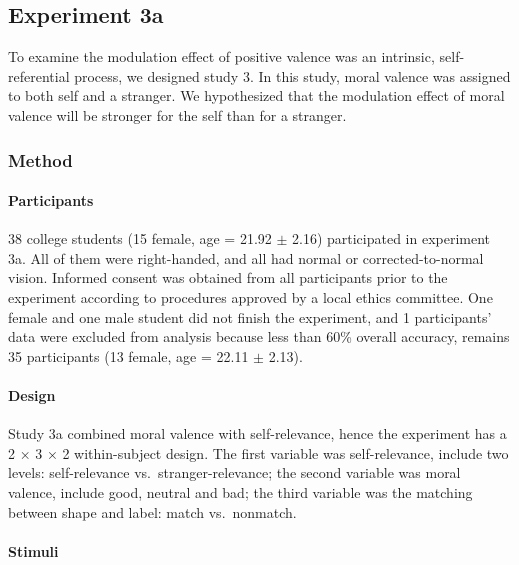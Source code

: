 \documentclass[
  english,
  man]{apa6}
\let\oldparagraph\paragraph
\renewcommand{\paragraph}[1]{\oldparagraph{#1}\mbox{}}
\begin{document}
\hypertarget{experiment-3a}{%
\subsection{Experiment 3a}\label{experiment-3a}}

To examine the modulation effect of positive valence was an intrinsic, self-referential process, we designed study 3. In this study, moral valence was assigned to both self and a stranger. We hypothesized that the modulation effect of moral valence will be stronger for the self than for a stranger.

\hypertarget{method-4}{%
\subsubsection{Method}\label{method-4}}

\hypertarget{participants-5}{%
\paragraph{Participants}\label{participants-5}}

38 college students (15 female, age = 21.92 \(\pm\) 2.16) participated in experiment 3a. All of them were right-handed, and all had normal or corrected-to-normal vision. Informed consent was obtained from all participants prior to the experiment according to procedures approved by a local ethics committee. One female and one male student did not finish the experiment, and 1 participants' data were excluded from analysis because less than 60\% overall accuracy, remains 35 participants (13 female, age = 22.11 \(\pm\) 2.13).

\hypertarget{design}{%
\paragraph{Design}\label{design}}

Study 3a combined moral valence with self-relevance, hence the experiment has a 2 × 3 × 2 within-subject design. The first variable was self-relevance, include two levels: self-relevance vs.~stranger-relevance; the second variable was moral valence, include good, neutral and bad; the third variable was the matching between shape and label: match vs.~nonmatch.

\hypertarget{stimuli-1}{%
\paragraph{Stimuli}\label{stimuli-1}}
\end{document}

